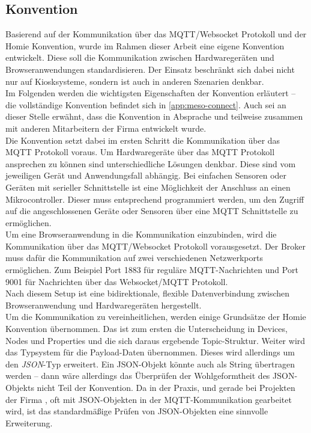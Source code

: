 \subsection{Konvention}
\label{subs:konvention}

Basierend auf der Kommunikation über das MQTT/Websocket Protokoll und der Homie Konvention,
wurde im Rahmen dieser Arbeit eine eigene Konvention entwickelt. Diese soll die Kommunikation
zwischen Hardwaregeräten und Browseranwendungen standardisieren. Der Einsatz beschränkt
sich dabei nicht nur auf Kiosksysteme, sondern ist auch in anderen Szenarien denkbar.\\
Im Folgenden werden die wichtigsten Eigenschaften der Konvention erläutert -- die vollständige
Konvention befindet sich in \autoref{app:meso-connect}. Auch sei an dieser Stelle erwähnt,
dass die Konvention in Absprache und teilweise zusammen mit anderen Mitarbeitern 
der Firma \meso{} entwickelt wurde.\\

Die Konvention setzt dabei im ersten Schritt die Kommunikation über das MQTT Protokoll voraus.
Um Hardwaregeräte über das MQTT Protokoll ansprechen zu können sind unterschiedliche Lösungen 
denkbar. Diese sind vom jeweiligen Gerät und Anwendungsfall abhängig. Bei einfachen Sensoren oder
Geräten mit serieller Schnittstelle ist eine Möglichkeit der Anschluss an einen Mikrocontroller.
Dieser muss entsprechend programmiert werden, um den Zugriff auf die angeschlossenen Geräte 
oder Sensoren über eine MQTT Schnittstelle zu ermöglichen.\\
Um eine Browseranwendung in die Kommunikation einzubinden, wird die Kommunikation über das MQTT/Websocket
Protokoll vorausgesetzt. Der Broker muss dafür die Kommunikation auf zwei verschiedenen 
Netzwerkports ermöglichen. Zum Beispiel Port 1883 für reguläre MQTT-Nachrichten und Port 9001
für Nachrichten über das Websocket/MQTT Protokoll.\\
Nach diesem Setup ist eine bidirektionale, flexible Datenverbindung zwischen Browseranwendung
und Hardwaregeräten hergestellt.\\

Um die Kommunikation zu vereinheitlichen, werden einige Grundsätze der Homie Konvention übernommen.
Das ist zum ersten die Unterscheidung in Devices, Nodes und Properties und die sich daraus 
ergebende Topic-Struktur. Weiter wird das Typsystem für die Payload-Daten übernommen. 
Dieses wird allerdings um den \emph{JSON}-Typ erweitert. 
Ein JSON-Objekt könnte auch als String übertragen werden -- dann wäre allerdings
das Überprüfen der Wohlgeformtheit des JSON-Objekts nicht Teil der Konvention.
Da in der Praxis, und gerade bei Projekten der Firma \meso{}, oft mit JSON-Objekten in der 
MQTT-Kommunikation gearbeitet wird, ist das standardmäßige Prüfen von JSON-Objekten eine
sinnvolle Erweiterung.

